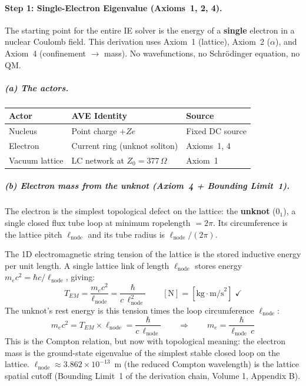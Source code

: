 \paragraph{Step 1: Single-Electron Eigenvalue (Axioms~1, 2, 4).}

The starting point for the entire IE solver is the energy of
a \textbf{single} electron in a nuclear Coulomb field.
This derivation uses Axiom~1 (lattice), Axiom~2 ($\alpha$),
and Axiom~4 (confinement $\to$ mass).  No wavefunctions,
no Schr\"odinger equation, no QM.

\subparagraph{(a) The actors.}
\begin{center}
\small
\begin{tabular}{lll}
\hline
\textbf{Actor} & \textbf{AVE Identity} & \textbf{Source} \\
\hline
Nucleus & Point charge $+Ze$ & Fixed DC source \\
Electron & Current ring (unknot soliton) & Axioms~1, 4 \\
Vacuum lattice & LC network at $Z_0 = 377\,\Omega$ & Axiom~1 \\
\hline
\end{tabular}
\end{center}

\subparagraph{(b) Electron mass from the unknot (Axiom~4 + Bounding Limit~1).}
The electron is the simplest topological defect on the lattice:
the \textbf{unknot} ($0_1$), a single closed flux tube loop
at minimum ropelength $= 2\pi$.  Its circumference is the
lattice pitch $\ell_{\text{node}}$ and its tube radius is
$\ell_{\text{node}}/(2\pi)$.

The 1D electromagnetic string tension of the lattice is the
stored inductive energy per unit length.  A single lattice
link of length $\ell_{\text{node}}$ stores energy
$m_e c^2 = \hbar c / \ell_{\text{node}}$, giving:
\begin{equation}
    T_{EM} = \frac{m_e c^2}{\ell_{\text{node}}}
    = \frac{\hbar}{c\,\ell_{\text{node}}^2}
    \qquad [\text{N}] = [\text{kg}\cdot\text{m/s}^2]\;\checkmark
    \label{eq:T_EM}
\end{equation}
The unknot's rest energy is this tension times the loop
circumference $\ell_{\text{node}}$:
\begin{equation}
    m_e c^2 = T_{EM} \times \ell_{\text{node}}
    = \frac{\hbar}{c\,\ell_{\text{node}}}
    \qquad\Longrightarrow\qquad
    \boxed{m_e = \frac{\hbar}{\ell_{\text{node}}\,c}}
    \label{eq:me_unknot}
\end{equation}
This is the Compton relation, but now with topological meaning:
the electron mass is the ground-state eigenvalue of the
simplest stable closed loop on the lattice.
$\ell_{\text{node}} \approx 3.862 \times 10^{-13}$~m
(the reduced Compton wavelength) is the lattice spatial cutoff
(Bounding Limit~1 of the derivation chain,
Volume 1, Appendix B).

